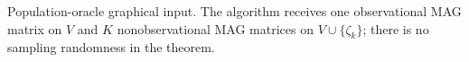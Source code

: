 Population-oracle graphical input.  The algorithm receives one observational MAG matrix on \(V\) and \(K\) nonobservational MAG matrices on \(V\cup\{\zeta_k\}\); there is no sampling randomness in the theorem.